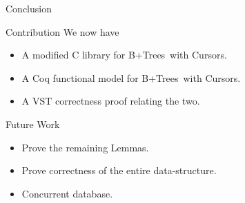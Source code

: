 \documentclass[page number,usenames,dvipsnames]{beamer}
\def\btrees{B+Trees}
\begin{document}
\begin{frame}{Conclusion}
  \begin{block}{Contribution}
    We now have
    \begin{itemize}
    \item A modified C library for \btrees\ with Cursors.
    \item A Coq functional model for \btrees\ with Cursors.
    \item A VST correctness proof relating the two.
    \end{itemize}
  \end{block}
  \vfill
  \begin{block}{Future Work}
    \begin{itemize}
    \item Prove the remaining Lemmas.
    \item Prove correctness of the entire data-structure.
    \item Concurrent database.
    \end{itemize}
  \end{block}
  
\end{frame}
\end{document}
